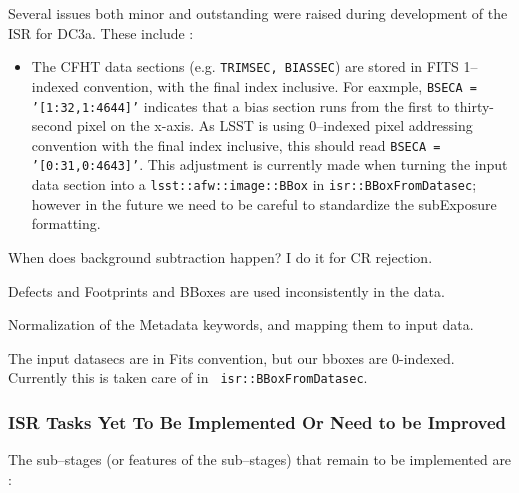 Several issues both minor and outstanding were raised during
development of the ISR for DC3a.  These include :

\begin{itemize}

\item The CFHT data sections (e.g. {\tt TRIMSEC, BIASSEC}) are stored
in FITS 1--indexed convention, with the final index inclusive.  For
eaxmple, {\tt BSECA = '[1:32,1:4644]'} indicates that a bias section
runs from the first to thirty-second pixel on the x-axis.  As LSST is
using 0--indexed pixel addressing convention with the final index
inclusive, this should read {\tt BSECA = '[0:31,0:4643]'}.  This
adjustment is currently made when turning the input data section into
a {\tt lsst::afw::image::BBox} in {\tt isr::BBoxFromDatasec}; however
in the future we need to be careful to standardize the subExposure
formatting.

\end{itemize}

When does background subtraction happen?  I do it for CR rejection.

Defects and Footprints and BBoxes are used inconsistently in the data.

Normalization of the Metadata keywords, and mapping them to input data.

The input datasecs are in Fits convention, but our bboxes are
0-indexed.  Currently this is taken care of in {\tt
isr::BBoxFromDatasec}.

\subsubsection{ISR Tasks Yet To Be Implemented Or Need to be Improved}



The sub--stages (or features of the sub--stages) that remain to be
implemented are :

